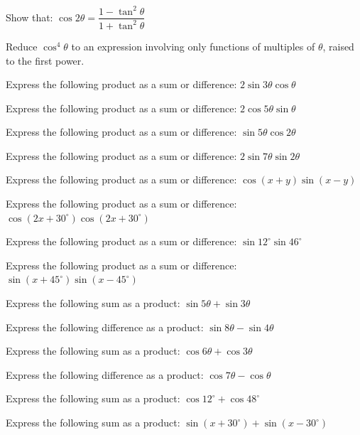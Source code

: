 \documentclass[11pt,a4paper]{article}
\begin{document}
\begin{shortlist}
\item Show that: $\cos2\theta = \dfrac{1-\tan^2\theta}{1+\tan^2\theta}$

\item Reduce $\cos^4\theta$ to an expression involving only functions of multiples of $\theta$, raised to the first power.

\item Express the following product as a sum or difference: $2\sin3\theta\cos\theta$

\item Express the following product as a sum or difference: $2\cos5\theta\sin\theta$

\item Express the following product as a sum or difference: $\sin5\theta\cos2\theta$

\item Express the following product as a sum or difference: $2\sin7\theta\sin2\theta$

\item Express the following product as a sum or difference: $\cos(x+y)\sin(x-y)$

\item Express the following product as a sum or difference: $\cos(2x+30^{\circ})\cos(2x+30^{\circ})$

\item Express the following product as a sum or difference: $\sin12^{\circ}\sin46^{\circ}$

\item Express the following product as a sum or difference: $\sin(x+45^{\circ})\sin(x-45^{\circ})$

\item Express the following sum as a product: $\sin5\theta+\sin3\theta$

\item Express the following difference as a product: $\sin8\theta-\sin4\theta$

\item Express the following sum as a product: $\cos6\theta+\cos3\theta$

\item Express the following difference as a product: $\cos7\theta-\cos\theta$

\item Express the following sum as a product: $\cos12^{\circ}+\cos48^{\circ}$

\item Express the following sum as a product: $\sin(x+30^{\circ})+\sin(x-30^{\circ})$


\end{shortlist}
\end{document}
